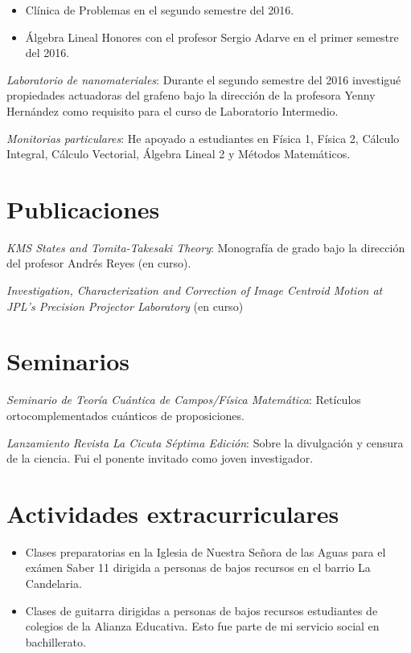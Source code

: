 \documentclass[line,margin]{res}
\begin{document}
\begin{resume}
\begin{itemize}
\item Clínica de Problemas en el segundo semestre del 2016.

\item Álgebra Lineal Honores con el profesor Sergio Adarve en el primer semestre del 2016.

\end{itemize}

{\sl Laboratorio de nanomateriales}: Durante el segundo semestre del 2016 investigué propiedades actuadoras del grafeno bajo la dirección de la profesora Yenny Hernández como requisito para el curso de Laboratorio Intermedio.
  
{\sl Monitorias particulares}: He apoyado a estudiantes en Física 1, Física 2, Cálculo Integral, Cálculo Vectorial, Álgebra Lineal 2 y  Métodos Matemáticos. 

\section{Publicaciones}

{\sl KMS States and Tomita-Takesaki Theory}: Monografía de grado bajo la dirección del profesor Andrés Reyes (en curso).

{\sl Investigation, Characterization and Correction of Image Centroid Motion at JPL's Precision Projector Laboratory} (en curso)

\section{Seminarios}

{\sl Seminario de Teoría Cuántica de Campos/Física Matemática}: Retículos ortocomplementados cuánticos de proposiciones.

{\sl Lanzamiento Revista La Cicuta Séptima Edición}: Sobre la divulgación y censura de la ciencia. Fui el ponente invitado como joven investigador. 
  
\section{Actividades extracurriculares}

\begin{itemize}

\item Clases preparatorias en la Iglesia de Nuestra Señora de las Aguas para el exámen Saber 11 dirigida a personas de bajos recursos en el barrio La Candelaria.

\item Clases de guitarra dirigidas a personas de bajos recursos estudiantes de colegios de la Alianza Educativa. Esto fue parte de mi servicio social en bachillerato.


\end{itemize}
\end{resume}
\end{document}
